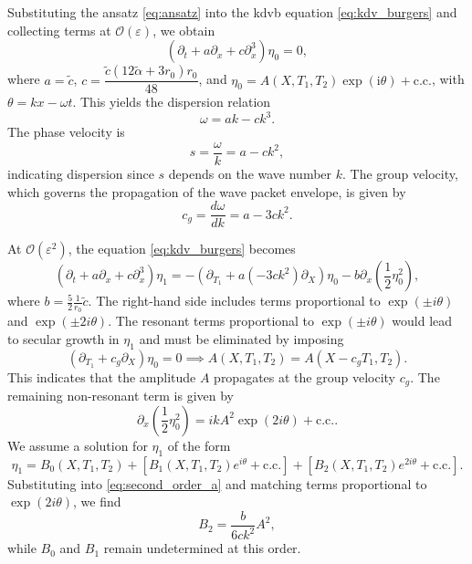 \documentclass[alpha-refs, 12pt]{wiley-article}
\renewcommand{\O}{\mathcal{O}}
\newcommand{\ui}{\mathrm{i}}
\newcommand{\eps}{\varepsilon}
\begin{document}
Substituting the ansatz \eqref{eq:ansatz} into the \acrshort{kdvb} equation \eqref{eq:kdv_burgers} and collecting terms at $\O(\eps)$, we obtain
\begin{equation}\label{eq:leading_order}
  \left( \partial_t + a \partial_x + c \partial_x^3 \right) \eta_0 = 0,
\end{equation}
where $a = \tilde{c}$, $c = \dfrac{\tilde{c} (12 \tilde{\alpha} + 3 r_0) r_0}{48}$, and $\eta_0 = A(X, T_1, T_2) \exp(\ui \theta) + \text{c.c.}$, with $\theta = k x - \omega t$. This yields the dispersion relation
\begin{equation}\label{eq:dispersion}
  \omega = a k - c k^3.
\end{equation}
The phase velocity is
\[
s = \frac{\omega}{k} = a - c k^2,
\]
indicating dispersion since $s$ depends on the wave number $k$. The group velocity, which governs the propagation of the wave packet envelope, is given by
\[
  c_g = \frac{d \omega}{d k} = a - 3 c k^2.
\]

At $\O(\eps^2)$, the equation \eqref{eq:kdv_burgers} becomes
\begin{equation}\label{eq:second_order_a}
  \left( \partial_t + a \partial_x + c \partial_x^3 \right) \eta_1 = - \left( \partial_{T_1} + a( - 3 c k^2) \partial_X \right) \eta_0 - b \partial_x \left( \frac{1}{2} \eta_0^2 \right),
\end{equation}
where $b = \frac{5}{2} \frac{1}{r_0} \tilde{c}$. The right-hand side includes terms proportional to $\exp(\pm i \theta)$ and $\exp(\pm 2 i \theta)$. The resonant terms proportional to $\exp(\pm i \theta)$ would lead to secular growth in $\eta_1$ and must be eliminated by imposing
\begin{equation}\label{eq:secular_elimination}
  \left( \partial_{T_1} + c_g \partial_X \right) \eta_0 = 0 \implies A(X, T_1, T_2) = A(X - c_g T_1, T_2).
\end{equation}
This indicates that the amplitude $A$ propagates at the group velocity $c_g$. The remaining non-resonant term is given by
\[
  \partial_x \left( \frac{1}{2} \eta_0^2 \right) = i k A^2 \exp(2 i \theta) + \text{c.c.}.
\]
We assume a solution for $\eta_1$ of the form
\begin{equation}\label{eq:eta1_form}
  \eta_1 = B_0(X, T_1, T_2) + \left[ B_1(X, T_1, T_2) e^{i \theta} + \text{c.c.} \right] + \left[ B_2(X, T_1, T_2) e^{2 i \theta} + \text{c.c.} \right].
\end{equation}
Substituting into \eqref{eq:second_order_a} and matching terms proportional to $\exp(2 i \theta)$, we find
\begin{equation}\label{eq:B2_solution}
  B_2 = \frac{b}{6 c k^2} A^2,
\end{equation}
while $B_0$ and $B_1$ remain undetermined at this order.
\end{document}

